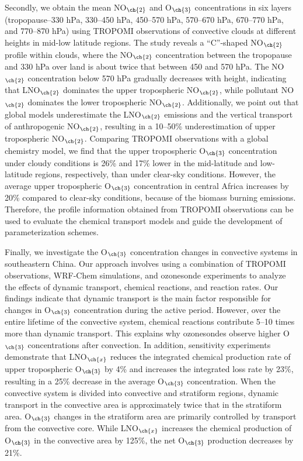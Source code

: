 {Secondly, we obtain the mean NO$_{\ch{2}}$ and O$_{\ch{3}}$ concentrations in six layers (tropopause--330 hPa, 330--450 hPa, 450--570 hPa, 570--670 hPa, 670--770 hPa, and 770--870 hPa) using TROPOMI observations of convective clouds at different heights in mid-low latitude regions.
The study reveals a ``C''-shaped NO$_{\ch{2}}$ profile within clouds, where the NO$_{\ch{2}}$ concentration between the tropopause and 330 hPa over land is about twice that between 450 and 570 hPa.
The NO$_{\ch{2}}$ concentration below 570 hPa gradually decreases with height, indicating that LNO$_{\ch{2}}$ dominates the upper tropospheric NO$_{\ch{2}}$, while pollutant NO$_{\ch{2}}$ dominates the lower tropospheric NO$_{\ch{2}}$.
Additionally, we point out that global models underestimate the LNO$_{\ch{2}}$ emissions and the vertical transport of anthropogenic NO$_{\ch{2}}$, resulting in a 10--50\% underestimation of upper tropospheric NO$_{\ch{2}}$.
Comparing TROPOMI observations with a global chemistry model, we find that the upper tropospheric O$_{\ch{3}}$ concentration under cloudy conditions is 26\% and 17\% lower in the mid-latitude and low-latitude regions, respectively, than under clear-sky conditions.
However, the average upper tropospheric O$_{\ch{3}}$ concentration in central Africa increases by 20\% compared to clear-sky conditions, because of the biomass burning emissions.
Therefore, the profile information obtained from TROPOMI observations can be used to evaluate the chemical transport models and guide the development of parameterization schemes.

Finally, we investigate the O$_{\ch{3}}$ concentration changes in convective systems in southeastern China.
Our approach involves using a combination of TROPOMI observations, WRF-Chem simulations, and ozonesonde experiments to analyze the effects of dynamic transport, chemical reactions, and reaction rates.
Our findings indicate that dynamic transport is the main factor responsible for changes in O$_{\ch{3}}$ concentration during the active period.
However, over the entire lifetime of the convective system, chemical reactions contribute 5--10 times more than dynamic transport.
This explains why ozonesondes observe higher O$_{\ch{3}}$ concentrations after convection.
In addition, sensitivity experiments demonstrate that LNO$_{\ch{x}}$ reduces the integrated chemical production rate of upper tropospheric O$_{\ch{3}}$ by 4\% and increases the integrated loss rate by 23\%,
resulting in a 25\% decrease in the average O$_{\ch{3}}$ concentration.
When the convective system is divided into convective and stratiform regions,
dynamic transport in the convective area is approximately twice that in the stratiform area.
O$_{\ch{3}}$ changes in the stratiform area are primarily controlled by transport from the convective core.
While LNO$_{\ch{x}}$ increases the chemical production of O$_{\ch{3}}$ in the convective area by 125\%, the net O$_{\ch{3}}$ production decreases by 21\%.

}
